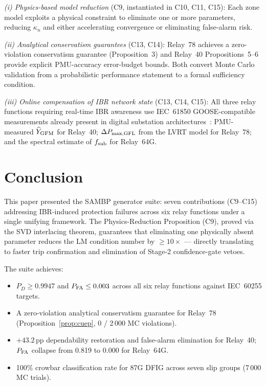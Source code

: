 \documentclass[journal,twoside]{IEEEtran}
\begin{document}
\textit{(i) Physics-based model reduction} (C9, instantiated in C10, C11, C15):
Each zone model exploits a physical constraint to eliminate one or more parameters,
reducing $\kappa_n$ and either accelerating convergence or eliminating
false-alarm risk.

\textit{(ii) Analytical conservatism guarantees} (C13, C14):
Relay~78 achieves a zero-violation conservatism guarantee (Proposition~3) and
Relay~40 Propositions~5--6 provide explicit PMU-accuracy error-budget bounds.
Both convert Monte Carlo validation from a probabilistic performance statement
to a formal sufficiency condition.

\textit{(iii) Online compensation of IBR network state} (C13, C14, C15):
All three relay functions requiring real-time IBR awareness use IEC~61850
GOOSE-compatible measurements already present in digital substation
architectures~\cite{IEC61850}: PMU-measured $\widehat{Y}_{\rm GFM}$ for
Relay~40; $\Delta P_{\rm max,GFL}$ from the LVRT model for Relay~78; and the
spectral estimate of $f_{\rm sub}$ for Relay~64G.

\section{Conclusion}
\label{sec:conclusion}

This paper presented the SAMBP generator suite: seven contributions (C9--C15)
addressing IBR-induced protection failures across six relay functions under a
single unifying framework.
The Physics-Reduction Proposition (C9), proved via the SVD interlacing theorem,
guarantees that eliminating one physically absent parameter reduces the LM
condition number by $\geq 10\times$ --- directly translating to faster trip
confirmation and elimination of Stage-2 confidence-gate vetoes.

The suite achieves:
\begin{itemize}
  \item $P_D \geq 0.9947$ and $P_{\rm FA} \leq 0.003$ across all six relay
        functions against IEC~60255 targets.
  \item A zero-violation analytical conservatism guarantee for Relay~78
        (Proposition~\ref{prop:cuep}, 0 / 2\,000 MC violations).
  \item $+43.2$\,pp dependability restoration and false-alarm elimination
        for Relay~40; $P_{\rm FA}$ collapse from 0.819 to 0.000 for Relay~64G.
  \item 100\% crowbar classification rate for 87G DFIG across seven slip groups
        (7\,000 MC trials).
\end{itemize}
\end{document}

